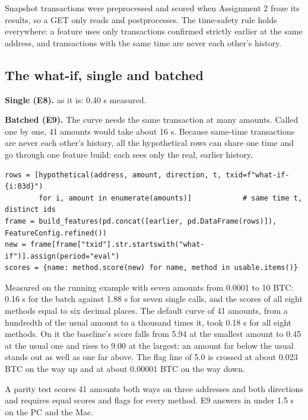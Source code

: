 Snapshot transactions were preprocessed and scored when Assignment 2 froze its results, so a GET
only reads and postprocesses. The time-safety rule holds everywhere: a feature uses only
transactions confirmed strictly earlier at the same address, and transactions with the same time are
never each other's history.

\subsection{The what-if, single and batched}
\label{sec:whatif}

\textbf{Single (E8).}  as it is: 0.40 s measured.

\textbf{Batched (E9).} The curve needs the same transaction at many amounts. Called one by one,
41 amounts would take about 16 s\est{}. Because same-time transactions are never each other's
history, all the hypothetical rows can share one time and go through one feature build: each sees
only the real, earlier history.

\begin{lstlisting}[style=py]
rows = [hypothetical(address, amount, direction, t, txid=f"what-if-{i:03d}")
        for i, amount in enumerate(amounts)]            # same time t, distinct ids
frame = build_features(pd.concat([earlier, pd.DataFrame(rows)]), FeatureConfig.refined())
new = frame[frame["txid"].str.startswith("what-if")].assign(period="eval")
scores = {name: method.score(new) for name, method in usable.items()}
\end{lstlisting}

Measured on the running example with seven amounts from 0.0001 to 10 BTC: 0.16 s for the batch
against 1.88 s for seven single calls, and the scores of all eight methods equal to six decimal
places. The default curve of 41 amounts, from a hundredth of the usual amount to a thousand times
it, took 0.18 s for all eight methods. On it the baseline's score falls from 5.94 at the smallest
amount to 0.45 at the usual one and rises to 9.00 at the largest: an amount far below the usual
stands out as well as one far above. The flag line of 5.0 is crossed at about 0.023 BTC on the way
up and at about 0.00001 BTC on the way down.

\begin{done}
A parity test scores 41 amounts both ways on three addresses and both directions and requires equal
scores and flags for every method. E9 answers in under 1.5 s on the PC and the Mac.
\end{done}

